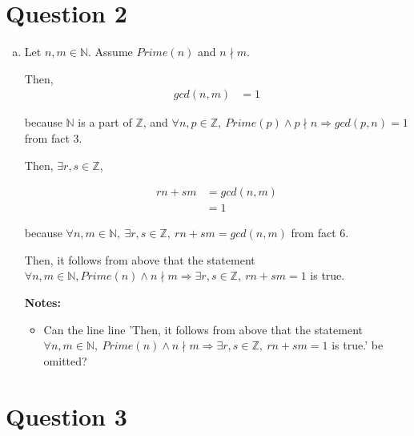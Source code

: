 \documentclass[12pt]{article}
\begin{document}
\begin{enumerate}
\begin{itemize}
    \end{itemize}


\end{enumerate}

\section*{Question 2}
\begin{enumerate}[a.]
    \item

    Let $n,m \in \mathbb{N}$. Assume $Prime(n)$ and $n \nmid m$.

    \bigskip

    Then,
    \setcounter{equation}{0}
    \begin{align}
        gcd(n,m) &= 1
    \end{align}

    because $\mathbb{N}$ is a part of $\mathbb{Z}$, and $\forall n,p \in \mathbb{Z},\:
    Prime(p) \land p \nmid n \Rightarrow gcd(p,n) = 1$ from fact 3.

    \bigskip

    Then, $\exists r, s \in \mathbb{Z}$,

    \begin{align}
        rn + sm &= gcd(n,m)\\
        &= 1
    \end{align}

    because $\forall n,m \in \mathbb{N},\:\exists r,s \in \mathbb{Z},\:rn + sm = gcd(n,m)$
    from fact 6.

    \bigskip

    Then, it follows from above that the statement $\forall n,m \in \mathbb{N},
    Prime(n) \land n \nmid m \Rightarrow \exists r,s \in \mathbb{Z},\:rn + sm = 1$ is true.

    \textbf{Notes:}
    \begin{itemize}
        \item Can the line line 'Then, it follows from above that the statement
        $\forall n,m \in \mathbb{N},\:Prime(n) \land n \nmid m \Rightarrow \exists
        r,s \in \mathbb{Z},\:rn + sm = 1$ is true.' be omitted?
    \end{itemize}


\end{enumerate}

\section*{Question 3}
\end{document}
